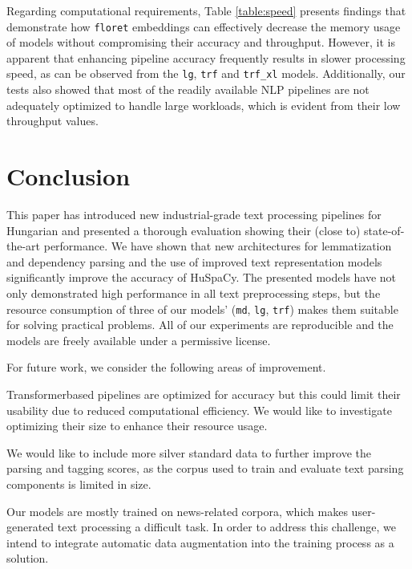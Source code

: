 \documentclass[runningheads,a4paper]{llncs}
\newcommand{\huspacy}{HuSpaCy}
\newcommand{\floret}{\texttt{floret}}
\newcommand{\huspacylg}{\texttt{lg}}
\newcommand{\huspacymd}{\texttt{md}}
\newcommand{\huspacytrf}{\texttt{trf}}
\newcommand{\huspacytrfxl}{\texttt{trf\_xl}}
\begin{document}
Regarding computational requirements, Table \ref{table:speed} presents findings that demonstrate how \floret{} embeddings can effectively decrease the memory usage of models without compromising their accuracy and throughput. However, it is apparent that enhancing pipeline accuracy frequently results in slower processing speed, as can be observed from the \huspacylg, \huspacytrf{} and \huspacytrfxl{} models. Additionally, our tests also showed that most of the readily available NLP pipelines are not adequately optimized to handle large workloads, which is evident from their low throughput values.

\section{Conclusion} \label{sec:conclusion}

This paper has introduced new industrial-grade text processing pipelines for Hungarian and presented a thorough evaluation showing their (close to) state-of-the-art performance. We have shown that new architectures for lemmatization and dependency parsing and the use of improved text representation models significantly improve the accuracy of \huspacy. The presented models have not only demonstrated high performance in all text preprocessing steps, but the resource consumption of three of our models’ (\huspacymd, \huspacylg, \huspacytrf) makes them suitable for solving practical problems. All of our experiments are reproducible and the models are freely available under a permissive license.%

For future work, we consider the following areas of improvement.
\begin{enumerate*}
    \item Transformer\-based pipelines are optimized for accuracy but this could limit their usability due to reduced computational efficiency. We would like to investigate optimizing their size to enhance their resource usage. 
    \item We would like to include more silver standard data to further improve the parsing and tagging scores, as the corpus used to train and evaluate text parsing components is limited in size. 
    \item Our models are mostly trained on news\hyp{}related corpora, which makes user-generated text processing a difficult task. In order to address this challenge, we intend to integrate automatic data augmentation into the training process as a solution.
\end{enumerate*}
\end{document}
